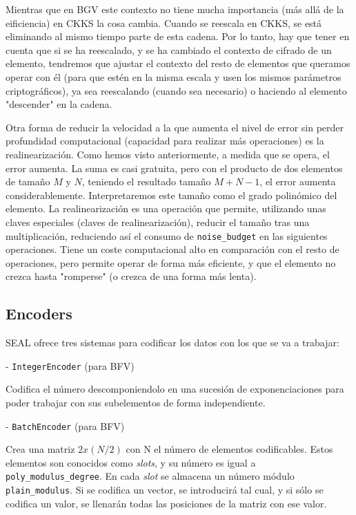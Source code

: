 Mientras que en BGV este contexto no tiene mucha importancia (más allá de la eificiencia) en CKKS la cosa cambia. Cuando se reescala en CKKS, se está eliminando al mismo tiempo parte de esta cadena. Por lo tanto, hay que tener en cuenta que si se ha reescalado, y se ha cambiado el contexto de cifrado de un elemento, tendremos que ajustar el contexto del resto de elementos que queramos operar con él (para que estén en la misma escala y usen los mismos parámetros criptográficos), ya sea reescalando (cuando sea necesario) o haciendo al elemento "descender" en la cadena.

Otra forma de reducir la velocidad a la que aumenta el nivel de error sin perder profundidad computacional (capacidad para realizar más operaciones) es la realinearización. Como hemos visto anteriormente, a medida que se opera, el error aumenta. La suma es casi gratuita, pero con el producto de dos elementos de tamaño $M$ y $N$, teniendo el resultado tamaño $M+N-1$, el error aumenta considerablemente. Interpretaremos este tamaño como el grado polinómico del elemento. La realinearización es una operación que permite, utilizando unas claves especiales (claves de realinearización), reducir el tamaño tras una multiplicación, reduciendo así el consumo de \verb|noise_budget| en las siguientes operaciones. Tiene un coste computacional alto en comparación con el resto de operaciones, pero permite operar de forma más eficiente, y que el elemento no crezca hasta "romperse" (o crezca de una forma más lenta).

\subsection{Encoders}

SEAL ofrece tres sistemas para codificar los datos con los que se va a trabajar:

    - \verb|IntegerEncoder| (para BFV)

    Codifica el número descomponiendolo en una sucesión de exponenciaciones para poder trabajar con sus subelementos de forma independiente.

    - \verb|BatchEncoder| (para BFV)

    Crea una matriz $2x(N/2)$ con N el número de elementos codificables. Estos elementos son conocidos como \textit{slots}, y su número es igual a \verb|poly_modulus_degree|. En cada \textit{slot} se almacena un número módulo \verb|plain_modulus|. Si se codifica un vector, se introducirá tal cual, y si sólo se codifica un valor, se llenarán todas las posiciones de la matriz con ese valor.

